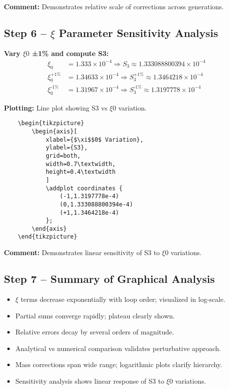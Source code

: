 \documentclass[12pt,a4paper]{article}
\begin{document}
\textbf{Comment:} Demonstrates relative scale of corrections across generations.

\subsection{Step 6 – $\xi$ Parameter Sensitivity Analysis}

\textbf{Vary $\xi$$0$ ±1\% and compute S3:}
\begin{align}
	\xi_0 &= 1.333 \times 10^{-4} \Rightarrow S_3 \approx 1.333088800394 \times 10^{-4} \\
	\xi_0^\text{+1\%} &= 1.34633 \times 10^{-4} \Rightarrow S_3^\text{+1\%} \approx 1.3464218 \times 10^{-4} \\
	\xi_0^\text{-1\%} &= 1.31967 \times 10^{-4} \Rightarrow S_3^\text{-1\%} \approx 1.3197778 \times 10^{-4}
\end{align}

\textbf{Plotting:} Line plot showing S3 vs $\xi$$0$ variation.
\begin{verbatim}
	\begin{tikzpicture}
		\begin{axis}[
			xlabel={$\xi$$0$ Variation},
			ylabel={S3},
			grid=both,
			width=0.7\textwidth,
			height=0.4\textwidth
			]
			\addplot coordinates {
				(-1,1.3197778e-4)
				(0,1.333088800394e-4)
				(+1,1.3464218e-4)
			};
		\end{axis}
	\end{tikzpicture}
\end{verbatim}

\textbf{Comment:} Demonstrates linear sensitivity of S3 to $\xi$$0$ variations.

\subsection{Step 7 – Summary of Graphical Analysis}

\begin{itemize}
	\item $\xi$ terms decrease exponentially with loop order; visualized in log-scale.
	\item Partial sums converge rapidly; plateau clearly shown.
	\item Relative errors decay by several orders of magnitude.
	\item Analytical vs numerical comparison validates perturbative approach.
	\item Mass corrections span wide range; logarithmic plots clarify hierarchy.
	\item Sensitivity analysis shows linear response of S3 to $\xi$$0$ variations.
\end{itemize}
\end{document}
